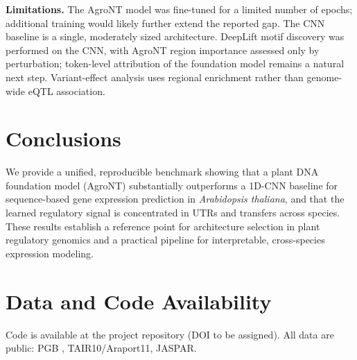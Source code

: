 \documentclass[11pt,a4paper]{article}
\begin{document}
\textbf{Limitations.} The AgroNT model was fine-tuned for a limited number of epochs; additional training would likely further extend the reported gap. The CNN baseline is a single, moderately sized architecture. DeepLift motif discovery was performed on the CNN, with AgroNT region importance assessed only by perturbation; token-level attribution of the foundation model remains a natural next step. Variant-effect analysis uses regional enrichment rather than genome-wide eQTL association.

\section{Conclusions}
We provide a unified, reproducible benchmark showing that a plant DNA foundation model (AgroNT) substantially outperforms a 1D-CNN baseline for sequence-based gene expression prediction in \emph{Arabidopsis thaliana}, and that the learned regulatory signal is concentrated in UTRs and transfers across species. These results establish a reference point for architecture selection in plant regulatory genomics and a practical pipeline for interpretable, cross-species expression modeling.

\section*{Data and Code Availability}
Code is available at the project repository (DOI to be assigned). All data are public: PGB \cite{pgb2024}, TAIR10/Araport11, JASPAR.
\end{document}
